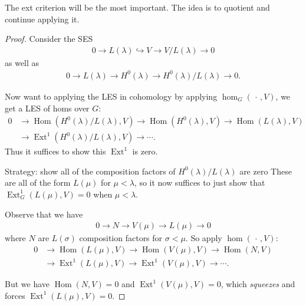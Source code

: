 \begin{remark}

The ext criterion will be the most important. The idea is to quotient
and continue applying it.

\end{remark}

\begin{proof}

Consider the SES
\begin{align*}  
0 \to L(\lambda) \hookrightarrow V \to V/L(\lambda) \to 0
\end{align*}
as well as
\begin{align*}  
0 \to L(\lambda) \to H^0(\lambda) \to H^0(\lambda)/L(\lambda) \to 0
.\end{align*}

Now want to applying the LES in cohomology by applying
\(\hom_G({\,\cdot\,}, V)\), we get a LES of homs over \(G\):
\begin{align*}  
0 &\to {\operatorname{Hom}}(H^0(\lambda)/L(\lambda), V) \to
{\operatorname{Hom}}(H^0(\lambda) , V) \to
{\operatorname{Hom}}(L(\lambda), V)  \\
&\to \operatorname{Ext}^1(H^0(\lambda)/L(\lambda), V) \to \cdots
.\end{align*}
Thus it suffices to show this \(\operatorname{Ext}^1\) is zero.

Strategy: show all of the composition factors of
\(H^0(\lambda)/L(\lambda)\) are zero These are all of the form
\(L(\mu)\) for \(\mu < \lambda\), so it now suffices to just show that
\(\operatorname{Ext}_G^1(L(\mu), V) = 0\) when \(\mu < \lambda\).

Observe that we have
\begin{align*}  
0 \to N \to V(\mu) \to L(\mu) \to 0
\end{align*}
where \(N\) are \(L(\sigma)\) composition factors for \(\sigma < \mu\).
So apply \(\hom({\,\cdot\,}, V)\):
\begin{align*}  
0 
&\to
{\operatorname{Hom}}(L(\mu), V) \to
{\operatorname{Hom}}(V(\mu), V) \to
{\operatorname{Hom}}(N, V) \\
&\to
\operatorname{Ext}^1(L(\mu), V) \to
\operatorname{Ext}^1(V(\mu), V) \to \cdots
.\end{align*}

But we have \({\operatorname{Hom}}(N, V) =0\) and
\(\operatorname{Ext}^1(V(\mu), V) = 0\), which \emph{squeezes} and
forces \(\operatorname{Ext}^1(L(\mu), V) = 0\).

\end{proof}

